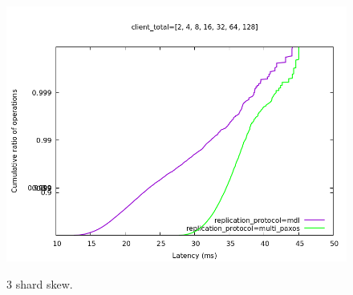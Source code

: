 \begin{figure}[tbp]
{  \includegraphics[scale=.2]{figs/3shards_fanout100_skew1.3_8client_CDF.png}
  \label{fig:3shardsskewlast}
}
\caption{3 shard skew.}
\end{figure}


